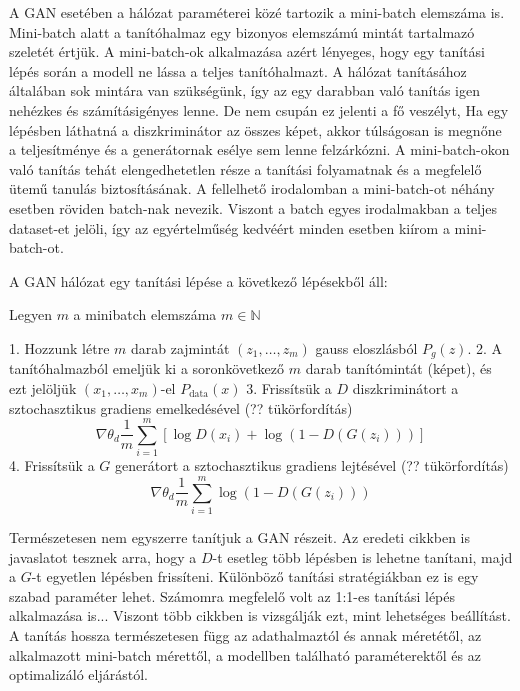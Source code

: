 A GAN esetében a hálózat paraméterei közé tartozik a mini-batch elemszáma is. Mini-batch alatt a tanítóhalmaz egy bizonyos elemszámú mintát tartalmazó szeletét értjük. A mini-batch-ok alkalmazása azért lényeges, hogy egy tanítási lépés során a modell ne lássa a teljes tanítóhalmazt. A hálózat tanításához általában sok mintára van szükségünk, így az egy darabban való tanítás igen nehézkes és számításigényes lenne. De nem csupán ez jelenti a fő veszélyt, Ha egy lépésben láthatná a diszkriminátor az összes képet, akkor túlságosan is megnőne a teljesítménye és a generátornak esélye sem lenne felzárkózni. A mini-batch-okon való tanítás tehát elengedhetetlen része a tanítási folyamatnak és a megfelelő ütemű tanulás biztosításának.
A fellelhető irodalomban a mini-batch-ot néhány esetben röviden batch-nak nevezik. Viszont a batch egyes irodalmakban a teljes dataset-et jelöli, így az egyértelműség kedvéért minden esetben kiírom a mini-batch-ot.


A GAN hálózat egy tanítási lépése a következő lépésekből áll:

Legyen $m$ a minibatch elemszáma $m \in \mathbb{N}$

1. Hozzunk létre $m$ darab zajmintát $(z_1, \ldots, z_m)$ gauss eloszlásból $P_g(z)$.
2. A tanítóhalmazból emeljük ki a soronkövetkező $m$ darab tanítómintát (képet), és ezt jelöljük $(x_1, \ldots, x_m)$-el $P_{\text{data}}(x)$
3. Frissítsük a $D$ diszkriminátort a sztochasztikus gradiens emelkedésével (?? tükörfordítás)
$$ \nabla \theta_d \frac{1}{m} \sum_{i=1}^{m} \left[\log D(x_i) + \log(1 - D(G(z_i))) \right]$$
4. Frissítsük a $G$ generátort a sztochasztikus gradiens lejtésével (?? tükörfordítás)
$$ \nabla \theta_d \frac{1}{m} \sum_{i=1}^{m} \log(1 - D(G(z_i)))$$

Természetesen nem egyszerre tanítjuk a GAN részeit. Az eredeti cikkben is javaslatot tesznek arra, hogy a $D$-t esetleg több lépésben is lehetne tanítani, majd a $G$-t egyetlen lépésben frissíteni.
Különböző tanítási stratégiákban ez is egy szabad paraméter lehet. Számomra megfelelő volt az 1:1-es tanítási lépés alkalmazása is... Viszont több cikkben is vizsgálják ezt, mint lehetséges beállítást.
A tanítás hossza természetesen függ az adathalmaztól és annak méretétől, az alkalmazott mini-batch mérettől, a modellben található paraméterektől és az optimalizáló eljárástól.

